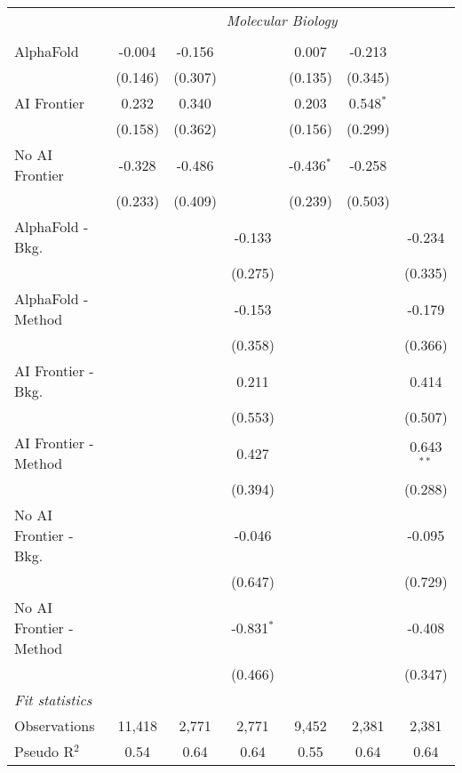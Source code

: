 \begin{tabular}{lcccccc}
 & \multicolumn{6}{c}{\textit{Molecular Biology}} \\ \\
   AlphaFold               & -0.004  & -0.156  &              & 0.007        & -0.213      &   \\   
                           & (0.146) & (0.307) &              & (0.135)      & (0.345)     &   \\   
   AI Frontier             & 0.232   & 0.340   &              & 0.203        & 0.548$^{*}$ &   \\   
                           & (0.158) & (0.362) &              & (0.156)      & (0.299)     &   \\   
   No AI Frontier          & -0.328  & -0.486  &              & -0.436$^{*}$ & -0.258      &   \\   
                           & (0.233) & (0.409) &              & (0.239)      & (0.503)     &   \\   
   AlphaFold - Bkg.        &         &         & -0.133       &              &             & -0.234\\   
                           &         &         & (0.275)      &              &             & (0.335)\\   
   AlphaFold - Method      &         &         & -0.153       &              &             & -0.179\\   
                           &         &         & (0.358)      &              &             & (0.366)\\   
   AI Frontier - Bkg.      &         &         & 0.211        &              &             & 0.414\\   
                           &         &         & (0.553)      &              &             & (0.507)\\   
   AI Frontier - Method    &         &         & 0.427        &              &             & 0.643$^{**}$\\   
                           &         &         & (0.394)      &              &             & (0.288)\\   
   No AI Frontier - Bkg.   &         &         & -0.046       &              &             & -0.095\\   
                           &         &         & (0.647)      &              &             & (0.729)\\   
   No AI Frontier - Method &         &         & -0.831$^{*}$ &              &             & -0.408\\   
                           &         &         & (0.466)      &              &             & (0.347)\\   
   \midrule
   \emph{Fit statistics}\\
   Observations            & 11,418  & 2,771   & 2,771        & 9,452        & 2,381       & 2,381\\  
   Pseudo R$^2$            & 0.54    & 0.64    & 0.64         & 0.55         & 0.64        & 0.64\\  
   

\end{tabular}
